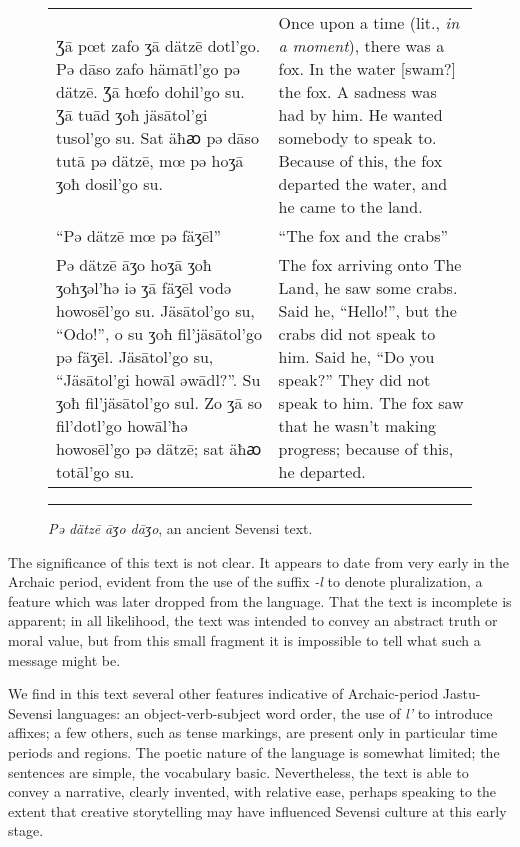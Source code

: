 \begin{figure}[ht]

\centering\small

\begin{tabular}{p{200pt}p{200pt}}
{\raggedleft Ʒā pœt zafo ʒā dätzē dotl’go.
Pǝ dāso zafo hämātl’go pǝ dätzē.
Ʒā ħœfo dohil'go su.
Ʒā tuād ʒoħ jäsātol’gi tusol’go su.
Sat äħꜵ pǝ dāso tutā pǝ dätzē, mœ pǝ hoʒā ʒoħ dosil’go su.\par}
&{\raggedright Once upon a time (lit., \emph{in a moment}), there was a fox.
In the water [swam?] the fox.
A sadness was had by him.
He wanted somebody to speak to.
Because of this, the fox departed the water, and he came to the land.\par}
\\{\raggedleft “Pə dätzē mœ pə fäʒēl”\par}
&{\raggedright “The fox and the crabs”\par}
\\{\raggedleft Pə dätzē āʒo hoʒā ʒoħ ʒoħʒəl'ħə iə ʒā fäʒēl vodə howosēl'go su.
Jäsātol'go su, “Odo!”, o su ʒoħ fil'jäsātol'go pə fäʒēl.
Jäsātol'go su, “Jäsātol'gi howāl əwādl?”.
Su ʒoħ fil'jäsātol'go sul.
Zo ʒā so fil'dotl'go howāl'ħə howosēl'go pə dätzē; sat äħꜵ totāl'go su.\par}
&{\raggedright The fox arriving onto The Land, he saw some crabs.
Said he, “Hello!”, but the crabs did not speak to him.
Said he, “Do you speak?”
They did not speak to him.
The fox saw that he wasn't making progress; because of this, he departed.\par}
\end{tabular}

\caption{\emph{Pə dätzē āʒo dāʒo}, an ancient Sevensi text.}
\label{archaic-translation}

\medskip\hrule

\end{figure}

The significance of this text is not clear.
It appears to date from very early in the Archaic period, evident from the use of the suffix \emph{-l} to denote pluralization, a feature which was later dropped from the language.
That the text is incomplete is apparent; in all likelihood, the text was intended to convey an abstract truth or moral value, but from this small fragment it is impossible to tell what such a message might be.

We find in this text several other features indicative of Archaic-period Jastu-Sevensi languages: an object-verb-subject word order, the use of \emph{l'} to introduce affixes; a few others, such as tense markings, are present only in particular time periods and regions.
The poetic nature of the language is somewhat limited; the sentences are simple, the vocabulary basic.
Nevertheless, the text is able to convey a narrative, clearly invented, with relative ease, perhaps speaking to the extent that creative storytelling may have influenced Sevensi culture at this early stage.

